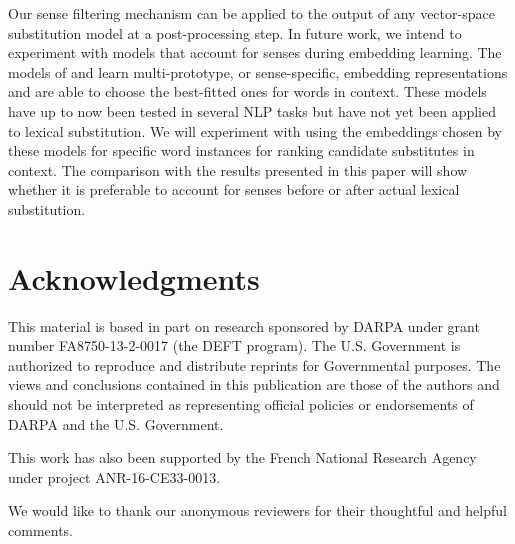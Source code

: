 \documentclass[11pt]{article}
\begin{document}
Our sense filtering mechanism can be applied to the output of any vector-space substitution model at a post-processing step. In future work, we intend to experiment with models that account for senses during embedding learning. The models of  and  learn multi-prototype, or sense-specific, embedding representations and are able to choose the best-fitted ones for words in context. These models have up to now been tested in several NLP tasks but have not yet been applied to lexical substitution. We will experiment with using the embeddings chosen by these models for specific word instances for ranking candidate substitutes in context. The comparison with the results presented in this paper will show whether it is preferable to account for senses before or after actual lexical substitution.

\section*{Acknowledgments}

This material is based in part on research sponsored by DARPA under grant number FA8750-13-2-0017 (the DEFT program). The U.S. Government is authorized to reproduce and distribute reprints for Governmental purposes. The views and conclusions contained in this publication are those of the authors and should not be interpreted as representing official policies or endorsements of DARPA and the U.S. Government.

This work has also been supported by the French National Research Agency under project ANR-16-CE33-0013.

We would like to thank our anonymous reviewers for their thoughtful and helpful comments.



\end{document}
